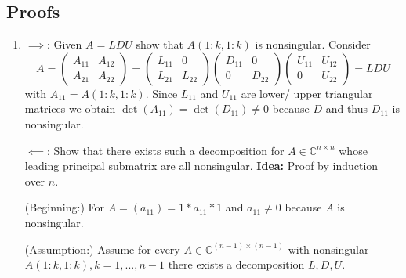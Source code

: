 \documentclass[a4paper, landscape,twocolumn,fontsize=9pt]{scrartcl}
\begin{document}
\subsection*{Proofs}
\begin{enumerate}
    \item $\implies$: Given $A = LDU$ show that $A(1:k, 1:k)$ is nonsingular. Consider
  	\[
  		A = \begin{pmatrix}
    		A_{11} & A_{12} \\ A_{21} & A_{22}
    	\end{pmatrix} = 
    	\begin{pmatrix}
    		L_{11} & 0 \\ L_{21} & L_{22}
    	\end{pmatrix}
    	\begin{pmatrix}
    		D_{11} & 0 \\ 0 & D_{22}
    	\end{pmatrix}
    	\begin{pmatrix}
    		U_{11} & U_{12} \\ 0 & U_{22}
    	\end{pmatrix} = LDU
    \] with $A_{11} = A(1:k, 1:k)$. Since $L_{11}$ and $U_{11}$ are lower/ upper triangular matrices we obtain $\det(A_{11}) = \det(D_{11}) \neq 0$ because $D$ and thus $D_{11}$ is nonsingular.
    
    $\impliedby$: Show that there exists such a decomposition for $A \in \mathbb C^{n \times n}$ whose leading principal submatrix are all nonsingular. \textbf{Idea:} Proof by induction over $n$. 
    
    (Beginning:) For $A = (a_{11}) = 1 * a_{11} * 1$ and $a_{11} \neq 0$ because $A$ is nonsingular. 
    
    (Assumption:) Assume for every $A \in \mathbb C^{(n-1) \times (n-1)}$ with nonsingular $A(1:k,1:k), k = 1,...,n-1$ there exists a decomposition $L,D, U$. 
    

\end{enumerate}
\end{document}
